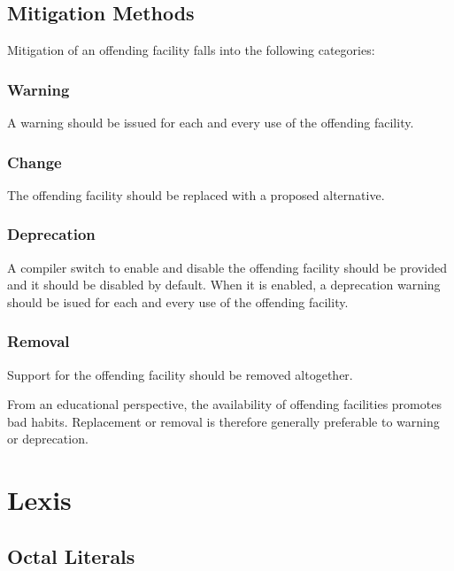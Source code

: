 \documentclass[10pt,a4paper]{article} %
\begin{document}
\subsection{Mitigation Methods}

Mitigation of an offending facility falls into the following categories:

\subsubsection{Warning}

A warning should be issued for each and every use of the offending facility.

\subsubsection{Change}

The offending facility should be replaced with a proposed alternative.

\subsubsection{Deprecation}

A compiler switch to enable and disable the offending facility should be provided and it should be disabled by default. When it is enabled, a deprecation warning should be isued for each and every use of the offending facility.

\subsubsection{Removal}

Support for the offending facility should be removed altogether.\\

\par\noindent From an educational perspective, the availability of offending facilities promotes bad habits. Replacement or removal is therefore generally preferable to warning or deprecation.


\section{Lexis}

\subsection{Octal Literals}
\end{document}
